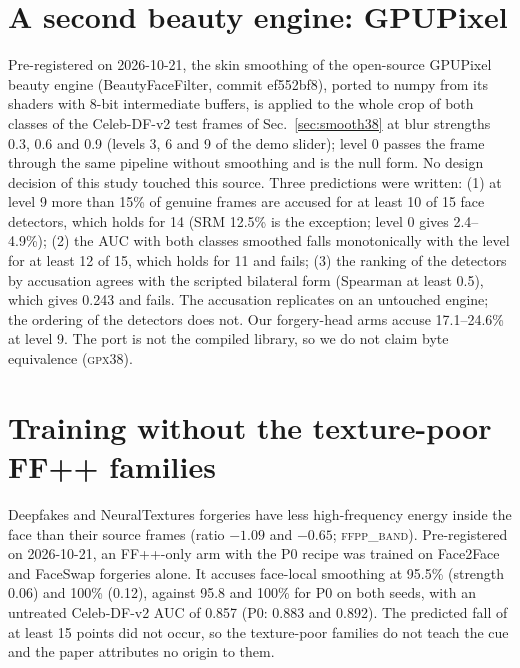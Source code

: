 \documentclass[10pt]{article}
\begin{document}
\section{A second beauty engine: GPUPixel}
\label{sec:gpx}
Pre-registered on 2026-10-21, the skin smoothing of the open-source GPUPixel beauty engine (BeautyFaceFilter,
commit ef552bf8), ported to numpy from its shaders with 8-bit intermediate buffers, is applied to the whole crop of both classes
of the Celeb-DF-v2 test frames of Sec.~\ref{sec:smooth38} at blur strengths 0.3, 0.6 and 0.9 (levels 3, 6 and 9 of the demo
slider); level 0 passes the frame through the same pipeline without smoothing and is the null form. No design
decision of this study touched this source. Three predictions were written: (1) at level 9 more than 15\% of genuine frames
are accused for at least 10 of 15 face detectors, which holds for 14 (SRM 12.5\% is the exception; level 0 gives 2.4--4.9\%);
(2) the AUC with both classes smoothed falls monotonically with the level for at least 12 of 15, which holds for 11 and fails;
(3) the ranking of the detectors by accusation agrees with the scripted bilateral form (Spearman at least 0.5), which gives
0.243 and fails. The accusation replicates on an untouched engine; the ordering of the detectors does not. Our forgery-head
arms accuse 17.1--24.6\% at level 9. The port is not the compiled library, so we do not claim byte equivalence (\textsc{gpx38}).

\section{Training without the texture-poor FF++ families}
\label{sec:noDFNT}
Deepfakes and NeuralTextures forgeries have less high-frequency energy inside the face than their source frames (ratio $-1.09$
and $-0.65$; \textsc{ffpp\_band}). Pre-registered on 2026-10-21, an FF++-only arm with the P0 recipe was trained on
Face2Face and FaceSwap forgeries alone. It accuses face-local smoothing at 95.5\% (strength 0.06) and 100\% (0.12), against
95.8 and 100\% for P0 on both seeds, with an untreated Celeb-DF-v2 AUC of 0.857 (P0: 0.883 and 0.892). The predicted fall of
at least 15 points did not occur, so the texture-poor families do not teach the cue and the paper attributes no origin to them.
\end{document}
